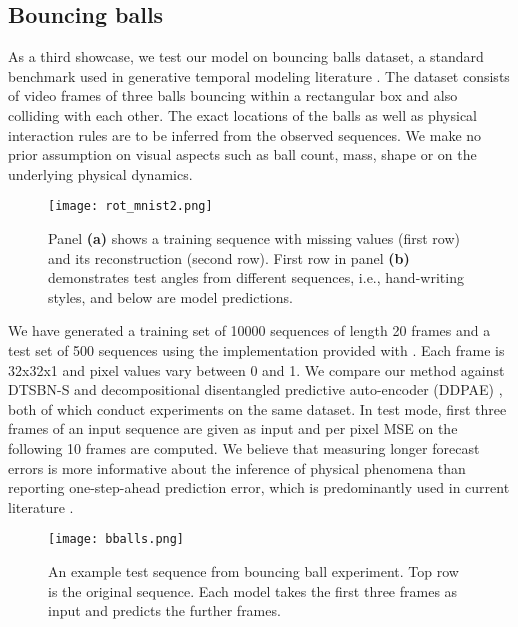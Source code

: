 \documentclass{article}
\newcommand{\0}{\mathbf{0}}
\begin{document}
\subsection{Bouncing balls}
As a third showcase, we test our model on bouncing balls dataset, a standard benchmark used in generative temporal modeling literature \citep{gan2015deep,hsieh2018learning,lotter2015unsupervised}. The dataset consists of video frames of three balls bouncing within a rectangular box and also colliding with each other. The exact locations of the balls as well as physical interaction rules are to be inferred from the observed sequences. We make no prior assumption on visual aspects such as ball count, mass, shape or on the underlying physical dynamics.  


\begin{figure}
\centering
\texttt{[image: rot\_mnist2.png]}
  \caption{Panel \textbf{(a)} shows a training sequence with missing values (first row) and its reconstruction (second row). First row in panel \textbf{(b)} demonstrates test angles from different sequences, i.e., hand-writing styles, and below are model predictions.}
  \label{fig:mnist}
\end{figure}

We have generated a training set of 10000 sequences of length 20 frames and a test set of 500 sequences using the implementation provided with \cite{sutskever2009recurrent}. Each frame is 32x32x1 and pixel values vary between 0 and 1. We compare our method against DTSBN-S \citep{gan2015deep} and decompositional disentangled predictive auto-encoder (DDPAE) \citep{hsieh2018learning}, both of which conduct experiments on the same dataset. In test mode, first three frames of an input sequence are given as input and per pixel MSE on the following 10 frames are computed. We believe that measuring longer forecast errors is more informative about the inference of physical phenomena than reporting one-step-ahead prediction error, which is predominantly used in current literature \citep{gan2015deep,lotter2015unsupervised}.


\begin{figure}[b]
\centering
\texttt{[image: bballs.png]}
  \caption{An example test sequence from bouncing ball experiment. Top row is the original sequence. Each model takes the first three frames as input and predicts the further frames.}
  \label{fig:balls}
\end{figure}
\end{document}
